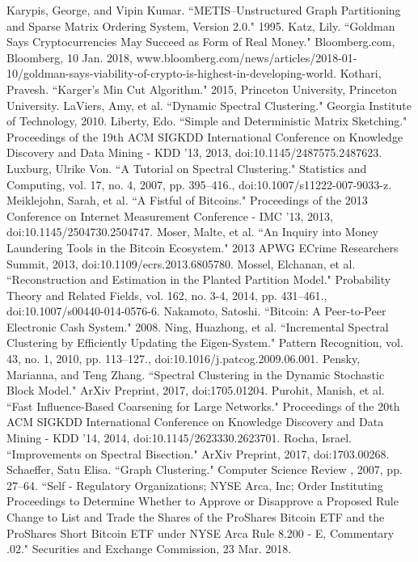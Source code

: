\documentclass[journal]{IEEEtran}
\begin{document}
\begin{thebibliography}{1}
 Karypis, George, and Vipin Kumar. ``METIS--Unstructured Graph Partitioning and Sparse Matrix Ordering System, Version 2.0." 1995.
 Katz, Lily. ``Goldman Says Cryptocurrencies May Succeed as Form of Real Money." Bloomberg.com, Bloomberg, 10 Jan. 2018, www.bloomberg.com/news/articles/2018-01-10/goldman-says-viability-of-crypto-is-highest-in-developing-world.
 Kothari, Pravesh. ``Karger's Min Cut Algorithm." 2015, Princeton University, Princeton University.
 LaViers, Amy, et al. ``Dynamic Spectral Clustering." Georgia Institute of Technology, 2010.
 Liberty, Edo. ``Simple and Deterministic Matrix Sketching." Proceedings of the 19th ACM SIGKDD International Conference on Knowledge Discovery and Data Mining - KDD '13, 2013, doi:10.1145/2487575.2487623.
 Luxburg, Ulrike Von. ``A Tutorial on Spectral Clustering." Statistics and Computing, vol. 17, no. 4, 2007, pp. 395–416., doi:10.1007/s11222-007-9033-z.
 Meiklejohn, Sarah, et al. ``A Fistful of Bitcoins." Proceedings of the 2013 Conference on Internet Measurement Conference - IMC '13, 2013, doi:10.1145/2504730.2504747.
 Moser, Malte, et al. ``An Inquiry into Money Laundering Tools in the Bitcoin Ecosystem." 2013 APWG ECrime Researchers Summit, 2013, doi:10.1109/ecrs.2013.6805780.
 Mossel, Elchanan, et al. ``Reconstruction and Estimation in the Planted Partition Model." Probability Theory and Related Fields, vol. 162, no. 3-4, 2014, pp. 431–461., doi:10.1007/s00440-014-0576-6.
 Nakamoto, Satoshi. ``Bitcoin: A Peer-to-Peer Electronic Cash System." 2008.
 Ning, Huazhong, et al. ``Incremental Spectral Clustering by Efficiently Updating the Eigen-System." Pattern Recognition, vol. 43, no. 1, 2010, pp. 113–127., doi:10.1016/j.patcog.2009.06.001.
 Pensky, Marianna, and Teng Zhang. ``Spectral Clustering in the Dynamic Stochastic Block Model." ArXiv Preprint, 2017, doi:1705.01204.
 Purohit, Manish, et al. ``Fast Influence-Based Coarsening for Large Networks." Proceedings of the 20th ACM SIGKDD International Conference on Knowledge Discovery and Data Mining - KDD '14, 2014, doi:10.1145/2623330.2623701.
 Rocha, Israel. ``Improvements on Spectral Bisection." ArXiv Preprint, 2017, doi:1703.00268.
 Schaeffer, Satu Elisa. ``Graph Clustering." Computer Science Review , 2007, pp. 27–64.
 ``Self - Regulatory Organizations; NYSE Arca, Inc; Order Instituting Proceedings to Determine Whether to Approve or Disapprove a Proposed Rule Change to List and Trade the Shares of the ProShares Bitcoin ETF and the ProShares Short Bitcoin ETF under NYSE Arca Rule 8.200 - E, Commentary .02." Securities and Exchange Commission, 23 Mar. 2018.

\end{thebibliography}
\end{document}
